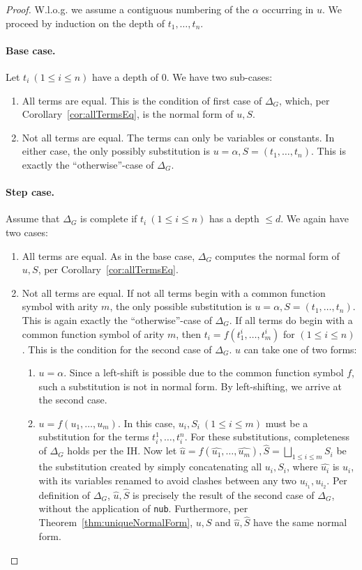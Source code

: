 \documentclass[a4paper, 11pt]{report}
\begin{document}
\begin{proof}
  W.l.o.g. we assume a contiguous numbering of the $\alpha$ occurring in $u$.
  We proceed by induction on the depth of $t_1,\dots,t_n$.

  \paragraph{Base case.} Let $t_i\ (1 \leq i \leq n)$ have a depth of 0. We have two sub-cases:
  \begin{enumerate}
    \item All terms are equal. This is the condition of first case of $\Delta_G$, which, per Corollary~\ref{cor:allTermsEq}, is the normal form of $u,S$.
    \item Not all terms are equal. The terms can only be variables or constants. In either case, the only possibly substitution is $u=\alpha, S=(t_1,\dots,t_n)$. This is exactly the ``otherwise''-case of $\Delta_G$.
  \end{enumerate}

  \paragraph{Step case.} Assume that $\Delta_G$ is complete if $t_i\ (1 \leq i \leq n)$ has a depth $\leq d$.
  We again have two cases:
  \begin{enumerate}
    \item All terms are equal. As in the base case, $\Delta_G$ computes the normal form of $u,S$, per Corollary~\ref{cor:allTermsEq}.
    \item Not all terms are equal. If not all terms begin with a common function symbol with arity $m$, the only possible substitution is $u=\alpha, S=(t_1,\dots,t_n)$. This is again exactly the ``otherwise''-case of $\Delta_G$.
    If all terms do begin with a common function symbol of arity $m$, then $t_i = f(t_1^i,\dots,t_m^i)$ for  $(1 \leq i \leq n)$. This is the condition for the second case of $\Delta_G$. $u$ can take one of two forms:
    \begin{enumerate}
      \item $u=\alpha$. Since a left-shift is possible due to the common function symbol $f$, such a substitution is not in normal form. By left-shifting, we arrive at the second case.
      \item $u=f(u_1,\dots,u_m)$. In this case, $u_i, S_i\ (1 \leq i \leq m)$ must be a substitution for the terms $t_i^1,\dots,t_i^n$. For these substitutions, completeness of $\Delta_G$ holds per the IH. Now let $\widehat{u}=f(\widehat{u_1},\dots,\widehat{u_m}),\widehat{S}=\bigsqcup\limits_{1 \leq i \leq m} S_i$ be the substitution created by simply concatenating all $u_i,S_i$, where $\widehat{u_i}$ is $u_i$, with its variables renamed to avoid clashes between any two $u_{i_1}, u_{i_2}$. Per definition of $\Delta_G$, $\widehat{u},\widehat{S}$ is precisely the result of the second case of $\Delta_G$, without the application of \texttt{nub}. Furthermore, per Theorem~\ref{thm:uniqueNormalForm}, $u,S$ and $\widehat{u},\widehat{S}$ have the same normal form.\\


\end{enumerate}
\end{enumerate}
\end{proof}
\end{document}
